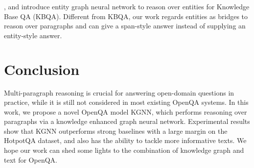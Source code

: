 \documentclass[11pt,a4paper]{article}
\newcommand\OurModel{KGNN\xspace}
\begin{document}
\citet{Haitian2019open}, \citet{de2018question} and \citet{cao2019bag} introduce entity graph neural network to reason over entities for Knowledge Base QA (KBQA). Different from KBQA, our work regards entities as bridges to reason over paragraphs and can give a span-style answer instead of supplying an entity-style answer.

\section{Conclusion}

Multi-paragraph reasoning is crucial for answering open-domain questions in practice, while it is still not considered in most existing OpenQA systems. In this work, we propose a novel OpenQA model \OurModel, which performs reasoning over paragraphs via a knowledge enhanced graph neural network. Experimental results show that \OurModel  outperforms strong baselines with a large margin on the HotpotQA dataset, and also has the ability to tackle more informative texts. We hope our work can shed some lights to the combination of knowledge graph and text for OpenQA.







\appendix

\label{sec:supplemental}
\end{document}
